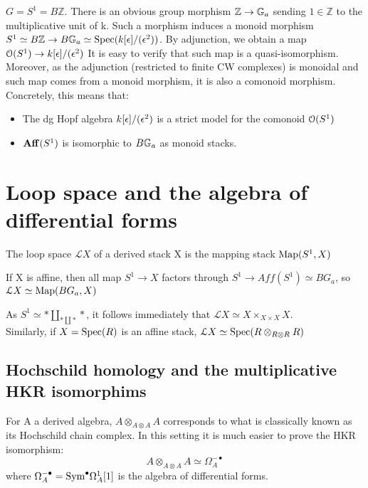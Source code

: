 \begin{refsection}
\begin{example}
\label{formality}
$G=S^1=B\mathbb{Z}$. There is an obvious group morphism $\mathbb{Z}\to \mathbb{G}_a$ sending $1\in\mathbb{Z}$ to the multiplicative unit of k. Such a morphism induces
a monoid morphism $S^1\simeq B\mathbb{Z}\to B\mathbb{G}_a\simeq \mathrm{Spec}(k[\epsilon]/(\epsilon^2))$. By adjunction, we obtain a map $\mathcal{O}(S^1)\to k[\epsilon]/(\epsilon^2)$
It is easy to verify that such map is a quasi-isomorphism. Moreover, as the adjunction (restricted to finite CW complexes) is monoidal and such map comes from a monoid
morphism, it is also a comonoid morphism. Concretely, this means that:
\begin{itemize}
 \item The dg Hopf algebra $k[\epsilon]/(\epsilon^2)$ is a strict model for the comonoid $\mathcal{O}(S^1)$
\item $\mathbf{Aff}(S^1)$ is isomorphic to $B\mathbb{G}_a$ as monoid stacks.
\end{itemize}

\end{example}



\section{Loop space and the algebra of differential forms}
\label{loop}
\begin{definition}
The loop space $\mathcal{L}X$ of a derived stack X is the mapping stack $\operatorname{\mathrm{Map}}(S^1,X)$
\end{definition}

\begin{remark}
If X is affine, then all map $S^1\to X$ factors through $S^1\to Aff(S^1)\simeq BG_a$, so\\ $\mathcal{L}X\simeq \operatorname{\mathrm{Map}}(BG_a,X)$
\end{remark}


\begin{remark}
As $\displaystyle S^1\simeq *\coprod_{*\coprod *}*$, it follows immediately that $\mathcal{L}X\simeq X\times_{X\times X}X$.\\
Similarly, if $X=\mathrm{Spec}(R)$ is an affine stack, $\mathcal{L}X\simeq \mathrm{Spec}(R\otimes_{R\otimes R}R)$
\end{remark}

\subsection{Hochschild homology and the multiplicative HKR isomorphims}

For A a derived algebra, $A\otimes_{A\otimes A}A$ corresponds to what is classically known as its Hochschild chain complex. In this setting it is much easier to
prove the HKR isomorphism: $$A\otimes_{A\otimes A}A\simeq \Omega_A^{-\bullet}$$ where $\Omega_A^{-\bullet}=\text{Sym}^{\bullet} \Omega^1_A[1]$ is the algebra of
differential forms.\\


\end{refsection}
